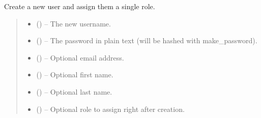 \documentclass[a4paper,11pt,spanish]{sphinxmanual}
\begin{document}
\begin{fulllineitems}
\label{\detokenize{api/users/users.services:users.services.create_user_with_role}}
\pysigstartsignatures
\pysiglinewithargsret
{}
{\sphinxparamcomma {}\sphinxparamcomma {}\sphinxparamcomma {}\sphinxparamcomma {}\sphinxparamcomma {}\sphinxparamcomma {}}
{}
\pysigstopsignatures
\sphinxAtStartPar
Create a new user and assign them a single role.
\begin{quote}\begin{description}
\begin{itemize}
\item {} 
\sphinxAtStartPar
{} () – The new username.

\item {} 
\sphinxAtStartPar
{} () – The password in plain text (will be hashed with make\_password).

\item {} 
\sphinxAtStartPar
{} () – Optional email address.

\item {} 
\sphinxAtStartPar
{} () – Optional first name.

\item {} 
\sphinxAtStartPar
{} () – Optional last name.

\item {} 
\sphinxAtStartPar
{} (\sphinxstyleliteralemphasis{\sphinxupquote{ | }}) – Optional role to assign right after creation.


\end{itemize}
\end{description}
\end{quote}
\end{fulllineitems}
\end{document}
